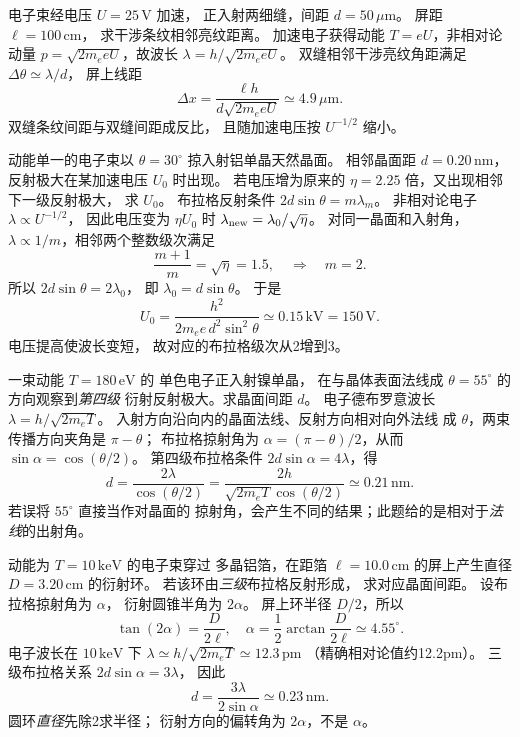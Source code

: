 电子束经电压 $U=25\,\mathrm V$ 加速，
正入射两细缝，间距
$d=50\,\mu\mathrm m$。
屏距 $\ell=100\,\mathrm{cm}$，
求干涉条纹相邻亮纹距离。
\exsolution
加速电子获得动能
$T=eU$，非相对论动量
$p=\sqrt{2m_eeU}$，故波长
$\lambda=h/\sqrt{2m_eeU}$。
双缝相邻干涉亮纹角距满足
$\Delta\theta\simeq\lambda/d$，
屏上线距
\[
 \boxed{\Delta x=
 \frac{\ell h}{d\sqrt{2m_eeU}}
 \simeq4.9\,\mu\mathrm m}.
\]
\excheck 双缝条纹间距与双缝间距成反比，
且随加速电压按 $U^{-1/2}$ 缩小。

动能单一的电子束以
$\theta=30^\circ$ 掠入射铝单晶天然晶面。
相邻晶面距 $d=0.20\,\mathrm{nm}$，
反射极大在某加速电压 $U_0$ 时出现。
若电压增为原来的
$\eta=2.25$ 倍，又出现相邻下一级反射极大，
求 $U_0$。
\exsolution
布拉格反射条件 $2d\sin\theta=m\lambda_m$。
非相对论电子
$\lambda\propto U^{-1/2}$，
因此电压变为 $\eta U_0$ 时
$\lambda_{\rm new}=\lambda_0/\sqrt\eta$。
对同一晶面和入射角，
$\lambda\propto1/m$，相邻两个整数级次满足
\[
 \frac{m+1}{m}=\sqrt\eta=1.5,
 \quad\Longrightarrow\quad m=2.
\]
所以
$2d\sin\theta=2\lambda_0$，
即 $\lambda_0=d\sin\theta$。
于是
\[
 \boxed{U_0=\frac{h^2}
 {2m_e e\,d^2\sin^2\theta}
 \simeq0.15\,\mathrm{kV}=150\,\mathrm V}.
\]
\excheck 电压提高使波长变短，
故对应的布拉格级次从2增到3。

一束动能 $T=180\,\mathrm{eV}$ 的
单色电子正入射镍单晶，
在与晶体表面法线成
$\theta=55^\circ$ 的方向观察到\emph{第四级}
衍射反射极大。求晶面间距 $d$。
\exsolution
电子德布罗意波长
$\lambda=h/\sqrt{2m_eT}$。
入射方向沿向内的晶面法线、反射方向相对向外法线
成 $\theta$，两束传播方向夹角是 $\pi-\theta$；
布拉格掠射角为
$\alpha=(\pi-\theta)/2$，从而
$\sin\alpha=\cos(\theta/2)$。
第四级布拉格条件
$2d\sin\alpha=4\lambda$，得
\[
 \boxed{d=\frac{2\lambda}{\cos(\theta/2)}
 =\frac{2h}{\sqrt{2m_eT}\cos(\theta/2)}
 \simeq0.21\,\mathrm{nm}}.
\]
\excheck 若误将 $55^\circ$ 直接当作对晶面的
掠射角，会产生不同的结果；此题给的是相对于\emph{法线}的出射角。

动能为 $T=10\,\mathrm{keV}$ 的电子束穿过
多晶铝箔，在距箔 $\ell=10.0\,\mathrm{cm}$
的屏上产生直径 $D=3.20\,\mathrm{cm}$ 的衍射环。
若该环由\emph{三级}布拉格反射形成，
求对应晶面间距。
\exsolution
设布拉格掠射角为 $\alpha$，
衍射圆锥半角为 $2\alpha$。
屏上环半径 $D/2$，所以
\[
 \tan(2\alpha)=\frac{D}{2\ell},
 \quad\alpha=\frac12\arctan\frac{D}{2\ell}
 \simeq4.55^\circ.
\]
电子波长在 $10\,\mathrm{keV}$ 下
$\lambda\simeq h/\sqrt{2m_eT}\simeq12.3\,\mathrm{pm}$
（精确相对论值约12.2pm）。
三级布拉格关系
$2d\sin\alpha=3\lambda$，
因此
\[
 \boxed{d=\frac{3\lambda}{2\sin\alpha}
 \simeq0.23\,\mathrm{nm}}.
\]
\excheck 圆环\emph{直径}先除2求半径；
衍射方向的偏转角为 $2\alpha$，不是 $\alpha$。

